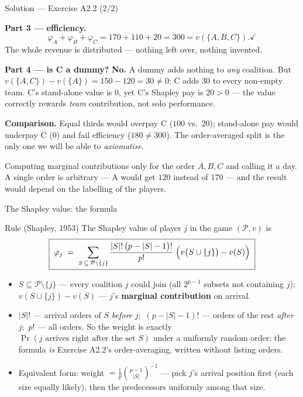 \documentclass[aspectratio=169,11pt]{beamer}
\begin{document}
\begin{frame}{Solution --- Exercise A2.2 (2/2)}
\begin{solutionbox}
  \textbf{Part 3 --- efficiency.}
  \[
    \varphi_A+\varphi_B+\varphi_C = 170+110+20 = 300 = v(\{A,B,C\}). \checkmark
  \]
  The whole revenue is distributed --- nothing left over, nothing invented.

  \medskip
  \textbf{Part 4 --- is C a dummy?} \textbf{No.} A dummy adds nothing to \emph{any}
  coalition. But $v(\{A,C\})-v(\{A\}) = 150-120 = 30 \neq 0$: C adds $30$ to every
  non-empty team. C's stand-alone value is $0$, yet C's Shapley pay is $20>0$ ---
  the value correctly rewards \emph{team} contribution, not solo performance.

  \medskip
  \textbf{Comparison.} Equal thirds would overpay C ($100$ vs.\ $20$); stand-alone
  pay would underpay C ($0$) and fail efficiency ($180\ne300$). The order-averaged
  split is the only one we will be able to \emph{axiomatise}.
\end{solutionbox}
\begin{mistake}
  Computing marginal contributions only for the order $A,B,C$ and calling it a day.
  A single order is arbitrary --- A would get $120$ instead of $170$ --- and the
  result would depend on the labelling of the players.
\end{mistake}
\end{frame}

\begin{frame}{The Shapley value: the formula}
  \footnotesize
  \begin{block}{Rule (Shapley, 1953)}
    The Shapley value of player $j$ in the game $(\mathcal{P},v)$ is
    \[
      \boxed{\;\varphi_j \;=\; \sum_{S \,\subseteq\, \mathcal{P}\setminus\{j\}}
      \frac{|S|!\,\bigl(p-|S|-1\bigr)!}{p!}\;
      \Bigl(v\bigl(S\cup\{j\}\bigr)-v(S)\Bigr)\;}
    \]
  \end{block}
  \begin{readme}
    \begin{itemize}
      \item $S \subseteq \mathcal{P}\setminus\{j\}$ --- every coalition $j$ could join
            (all $2^{p-1}$ subsets not containing $j$);\quad
            $v(S\cup\{j\})-v(S)$ --- $j$'s \textbf{marginal contribution} on arrival.
      \item $|S|!$ --- arrival orders of $S$ \emph{before} $j$;\ $(p-|S|-1)!$ ---
            orders of the rest \emph{after} $j$;\ $p!$ --- all orders. So the weight is
            exactly $\Pr(\text{$j$ arrives right after the set } S)$ under a uniformly
            random order: the formula \emph{is} Exercise A2.2's order-averaging,
            written without listing orders.
      \item Equivalent form: weight $=\frac{1}{p}\binom{p-1}{|S|}^{-1}$ --- pick $j$'s
            arrival position first (each size equally likely), then the predecessors
            uniformly among that size.
    \end{itemize}
  \end{readme}
\end{frame}
\end{document}
